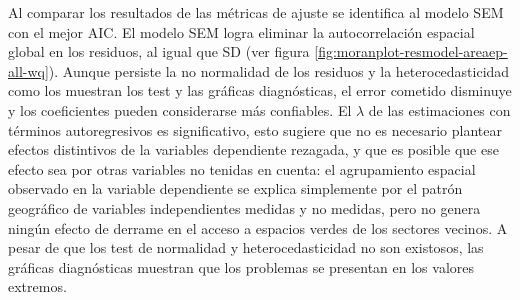 \documentclass[12pt,]{book}
\begin{document}
Al comparar los resultados de las métricas de ajuste se identifica al
modelo SEM con el mejor AIC. El modelo SEM logra eliminar la
autocorrelación espacial global en los residuos, al igual que SD (ver
figura \ref{fig:moranplot-resmodel-areaep-all-wq}). Aunque persiste la
no normalidad de los residuos y la heterocedasticidad como los muestran
los test y las gráficas diagnósticas, el error cometido disminuye y los
coeficientes pueden considerarse más confiables. El \(\lambda\) de las
estimaciones con términos autoregresivos es significativo, esto sugiere
que no es necesario plantear efectos distintivos de la variables
dependiente rezagada, y que es posible que ese efecto sea por otras
variables no tenidas en cuenta: el agrupamiento espacial observado en la
variable dependiente se explica simplemente por el patrón geográfico de
variables independientes medidas y no medidas, pero no genera ningún
efecto de derrame en el acceso a espacios verdes de los sectores
vecinos. A pesar de que los test de normalidad y heterocedasticidad no
son existosos, las gráficas diagnósticas muestran que los problemas se
presentan en los valores extremos.
\end{document}
